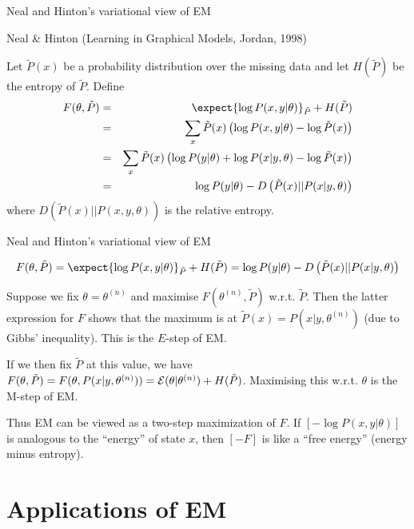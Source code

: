 \documentclass{beamer}
\begin{document}
\begin{frame}{Neal and Hinton's variational view of EM}

\itemb
 \item Neal \& Hinton (Learning in Graphical Models, Jordan, 1998)
  \itemb
  \item Let $\tilde{P}(x)$ be a probability distribution over the missing data and let $H(\tilde{P})$ be the entropy of $\tilde{P}$. Define
\begin{eqnarray*}
F(\theta,\tilde{P}) & = & \expect{\log P(x,y|\theta)}_{\tilde{P}} + H(\tilde{P}) \\
& = & \sum_x \tilde{P}(x) \left( \log P(x,y|\theta) - \log \tilde{P}(x) \right) \\
& = & \sum_x \tilde{P}(x) \left( \log P(y|\theta) + \log P(x|y,\theta) - \log \tilde{P}(x) \right) \\
& = & \log P(y|\theta) - D \left( \tilde{P}(x)||P(x|y,\theta) \right)
\end{eqnarray*}
where $D(\tilde{P}(x)||P(x,y,\theta))$ is the relative entropy.
  \iteme
 \iteme

\end{frame}

\begin{frame}{Neal and Hinton's variational view of EM}

\[
F(\theta,\tilde{P}) = \expect{\log P(x,y|\theta)}_{\tilde{P}} + H(\tilde{P}) = \log P(y|\theta) - D \left( \tilde{P}(x)||P(x|y,\theta) \right)
\]

\itemb
  \item Suppose we fix $\theta=\theta^{(n)}$ and maximise $F(\theta^{(n)},\tilde{P})$ w.r.t. $\tilde{P}$.
Then the latter expression for $F$ shows that the maximum is at $\tilde{P}(x) = P(x|y,\theta^{(n)})$ (due to Gibbs' inequality).
This is the $E$-step of EM.
  \item If we then fix $\tilde{P}$ at this value, we have $F(\theta,\tilde{P})=F(\theta,P(x|y,\theta^{(n)})) = {\cal E}(\theta|\theta^{(n)}) + H(\tilde{P})$.
Maximising this w.r.t. $\theta$ is the M-step of EM.
  \item Thus EM can be viewed as a two-step maximization of $F$.
If $\left[-\log P(x,y|\theta)\right]$ is analogous to the ``energy'' of state $x$, then $[-F]$ is like a ``free energy'' (energy minus entropy).
 \iteme

\end{frame}


\section{Applications of EM}
\end{document}
